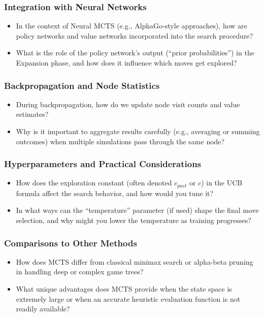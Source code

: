\subsubsection{Integration with Neural Networks}
\begin{itemize}
    \item In the context of Neural MCTS (e.g., AlphaGo-style approaches), how are policy networks and value networks incorporated into the search procedure?  
    \item What is the role of the policy network’s output (“prior probabilities”) in the Expansion phase, and how does it influence which moves get explored?
\end{itemize}


\subsubsection{Backpropagation and Node Statistics}
\begin{itemize}
    \item During backpropagation, how do we update node visit counts and value estimates?  
    \item Why is it important to aggregate results carefully (e.g., averaging or summing outcomes) when multiple simulations pass through the same node?
\end{itemize}


\subsubsection{Hyperparameters and Practical Considerations}
\begin{itemize}
    \item How does the exploration constant (often denoted \( c_{puct} \) or \( c \)) in the UCB formula affect the search behavior, and how would you tune it?  
    \item In what ways can the “temperature” parameter (if used) shape the final move selection, and why might you lower the temperature as training progresses?
\end{itemize}


\subsubsection{Comparisons to Other Methods}
\begin{itemize}
    \item How does MCTS differ from classical minimax search or alpha-beta pruning in handling deep or complex game trees?  
    \item What unique advantages does MCTS provide when the state space is extremely large or when an accurate heuristic evaluation function is not readily available?
\end{itemize}